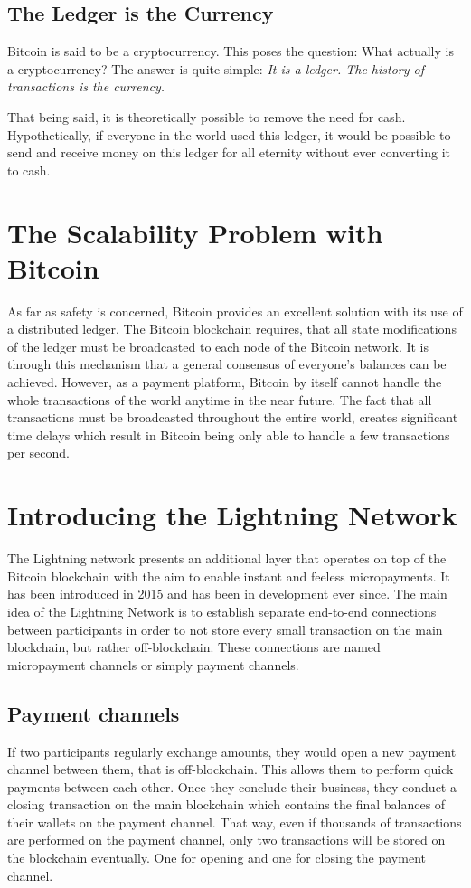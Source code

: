 \documentclass[a4paper, 12pt]{report}
\begin{document}
\section{The Ledger is the Currency}
\par Bitcoin is said to be a cryptocurrency. This poses the question: What actually is a cryptocurrency? The answer is quite simple: \textit{It is a ledger. The history of transactions is the currency.}
\par That being said, it is theoretically possible to remove the need for cash. Hypothetically, if everyone in the world used this ledger, it would be possible to send and receive money on this ledger for all eternity without ever converting it to cash.

\chapter{The Scalability Problem with Bitcoin}
\par As far as safety is concerned, Bitcoin provides an excellent solution with its use of a distributed ledger. The Bitcoin blockchain requires, that all state modifications of the ledger must be broadcasted to each node of the Bitcoin network. It is through this mechanism that a general consensus of everyone’s balances can be achieved. However, as a payment platform, Bitcoin by itself cannot handle the whole transactions of the world anytime in the near future. The fact that all transactions must be broadcasted throughout the entire world, creates significant time delays which result in Bitcoin being only able to handle a few transactions per second.

\chapter{Introducing the Lightning Network}
\par The Lightning network presents an additional layer that operates on top of the Bitcoin blockchain with the aim to enable instant and feeless micropayments. It has been introduced in 2015 and has been in development ever since. The main idea of the Lightning Network is to establish separate end-to-end connections between participants in order to not store every small transaction on the main blockchain, but rather off-blockchain. These connections are named micropayment channels or simply payment channels.

\section{Payment channels}
\par If two participants regularly exchange amounts, they would open a new payment channel between them, that is off-blockchain. This allows them to perform quick payments between each other. Once they conclude their business, they conduct a closing transaction on the main blockchain which contains the final balances of their wallets on the payment channel. That way, even if thousands of transactions are performed on the payment channel, only two transactions will be stored on the blockchain eventually. One for opening and one for closing the payment channel.
\end{document}
